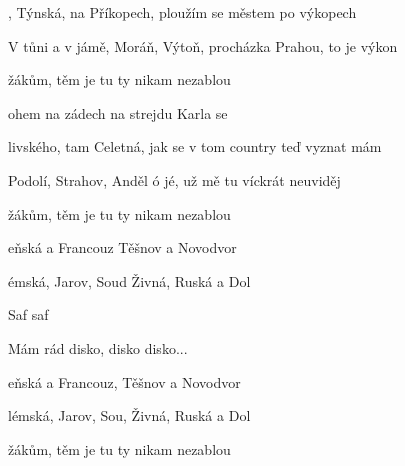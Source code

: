 

\zs
{}, Týnská, na Příkopech,
ploužím se městem po výkopech

V tůni a v jámě, Moráň, Výtoň,
procházka Prahou, to je výkon
\ks

\zr
{}žákům, těm je tu 
ty nikam nezablou

ohem na zádech 
na strejdu Karla se 
\kr

\zs
{}livského, tam Celetná,
jak se v tom country teď vyznat mám

Podolí, Strahov, Anděl ó jé,
už mě tu víckrát neuviděj
\ks

\zr
{}žákům, těm je tu 
ty nikam nezablou

eňská a Francouz
Těšnov a Novodvor

émská, Jarov, Soud
Živná, Ruská a Dol

Saf saf

Mám rád disko, disko disko...
\kr


\zr
{}eňská a Francouz,
Těšnov a Novodvor

lémská, Jarov, Sou,
Živná, Ruská a Dol
\kr

\zr
{}žákům, těm je tu 
ty nikam nezablou
\kr
\kp



